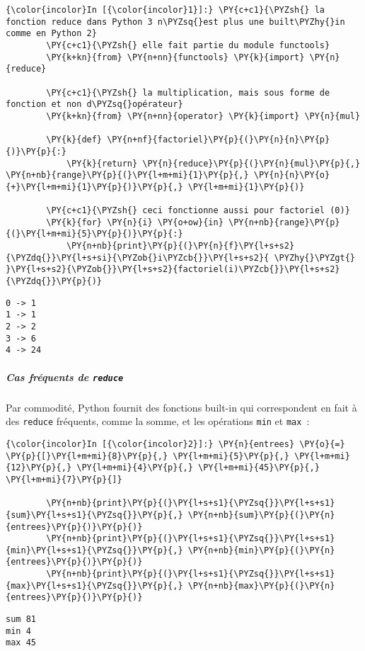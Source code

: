     \begin{Verbatim}[commandchars=\\\{\}]
{\color{incolor}In [{\color{incolor}1}]:} \PY{c+c1}{\PYZsh{} la fonction reduce dans Python 3 n\PYZsq{}est plus une built\PYZhy{}in comme en Python 2}
        \PY{c+c1}{\PYZsh{} elle fait partie du module functools}
        \PY{k+kn}{from} \PY{n+nn}{functools} \PY{k}{import} \PY{n}{reduce}
        
        \PY{c+c1}{\PYZsh{} la multiplication, mais sous forme de fonction et non d\PYZsq{}opérateur}
        \PY{k+kn}{from} \PY{n+nn}{operator} \PY{k}{import} \PY{n}{mul}
        
        \PY{k}{def} \PY{n+nf}{factoriel}\PY{p}{(}\PY{n}{n}\PY{p}{)}\PY{p}{:}
            \PY{k}{return} \PY{n}{reduce}\PY{p}{(}\PY{n}{mul}\PY{p}{,} \PY{n+nb}{range}\PY{p}{(}\PY{l+m+mi}{1}\PY{p}{,} \PY{n}{n}\PY{o}{+}\PY{l+m+mi}{1}\PY{p}{)}\PY{p}{,} \PY{l+m+mi}{1}\PY{p}{)}
        
        \PY{c+c1}{\PYZsh{} ceci fonctionne aussi pour factoriel (0)}
        \PY{k}{for} \PY{n}{i} \PY{o+ow}{in} \PY{n+nb}{range}\PY{p}{(}\PY{l+m+mi}{5}\PY{p}{)}\PY{p}{:}
            \PY{n+nb}{print}\PY{p}{(}\PY{n}{f}\PY{l+s+s2}{\PYZdq{}}\PY{l+s+si}{\PYZob{}i\PYZcb{}}\PY{l+s+s2}{ \PYZhy{}\PYZgt{} }\PY{l+s+s2}{\PYZob{}}\PY{l+s+s2}{factoriel(i)\PYZcb{}}\PY{l+s+s2}{\PYZdq{}}\PY{p}{)}
\end{Verbatim}


    \begin{Verbatim}[commandchars=\\\{\}]
0 -> 1
1 -> 1
2 -> 2
3 -> 6
4 -> 24

    \end{Verbatim}

    \hypertarget{cas-fruxe9quents-de-reduce}{%
\subparagraph{\texorpdfstring{Cas fréquents de
\texttt{reduce}}{Cas fréquents de reduce}}\label{cas-fruxe9quents-de-reduce}}

    Par commodité, Python fournit des fonctions built-in qui correspondent
en fait à des \texttt{reduce} fréquents, comme la somme, et les
opérations \texttt{min} et \texttt{max}~:

    \begin{Verbatim}[commandchars=\\\{\}]
{\color{incolor}In [{\color{incolor}2}]:} \PY{n}{entrees} \PY{o}{=} \PY{p}{[}\PY{l+m+mi}{8}\PY{p}{,} \PY{l+m+mi}{5}\PY{p}{,} \PY{l+m+mi}{12}\PY{p}{,} \PY{l+m+mi}{4}\PY{p}{,} \PY{l+m+mi}{45}\PY{p}{,} \PY{l+m+mi}{7}\PY{p}{]}
        
        \PY{n+nb}{print}\PY{p}{(}\PY{l+s+s1}{\PYZsq{}}\PY{l+s+s1}{sum}\PY{l+s+s1}{\PYZsq{}}\PY{p}{,} \PY{n+nb}{sum}\PY{p}{(}\PY{n}{entrees}\PY{p}{)}\PY{p}{)}
        \PY{n+nb}{print}\PY{p}{(}\PY{l+s+s1}{\PYZsq{}}\PY{l+s+s1}{min}\PY{l+s+s1}{\PYZsq{}}\PY{p}{,} \PY{n+nb}{min}\PY{p}{(}\PY{n}{entrees}\PY{p}{)}\PY{p}{)}
        \PY{n+nb}{print}\PY{p}{(}\PY{l+s+s1}{\PYZsq{}}\PY{l+s+s1}{max}\PY{l+s+s1}{\PYZsq{}}\PY{p}{,} \PY{n+nb}{max}\PY{p}{(}\PY{n}{entrees}\PY{p}{)}\PY{p}{)}
\end{Verbatim}


    \begin{Verbatim}[commandchars=\\\{\}]
sum 81
min 4
max 45

    \end{Verbatim}


    
    
    
